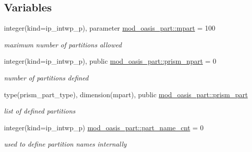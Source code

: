 \subsection*{Variables}
\begin{DoxyCompactItemize}
\item 
integer(kind=ip\+\_\+intwp\+\_\+p), parameter \hyperlink{namespacemod__oasis__part_ab68d087792db0351181c9a97025d793b}{mod\+\_\+oasis\+\_\+part\+::mpart} = 100
\begin{DoxyCompactList}\small\item\em maximum number of partitions allowed \end{DoxyCompactList}\item 
integer(kind=ip\+\_\+intwp\+\_\+p), public \hyperlink{namespacemod__oasis__part_ac8340e63b159a9786ad8fffabd1d47f8}{mod\+\_\+oasis\+\_\+part\+::prism\+\_\+npart} = 0
\begin{DoxyCompactList}\small\item\em number of partitions defined \end{DoxyCompactList}\item 
type(prism\+\_\+part\+\_\+type), dimension(mpart), public \hyperlink{namespacemod__oasis__part_a326ce52f630ba7e71905af864a6cb2dc}{mod\+\_\+oasis\+\_\+part\+::prism\+\_\+part}
\begin{DoxyCompactList}\small\item\em list of defined partitions \end{DoxyCompactList}\item 
integer(kind=ip\+\_\+intwp\+\_\+p) \hyperlink{namespacemod__oasis__part_a8cee930f023feb7bcad4a0cab0b490a1}{mod\+\_\+oasis\+\_\+part\+::part\+\_\+name\+\_\+cnt} = 0
\begin{DoxyCompactList}\small\item\em used to define partition names internally \end{DoxyCompactList}\end{DoxyCompactItemize}
